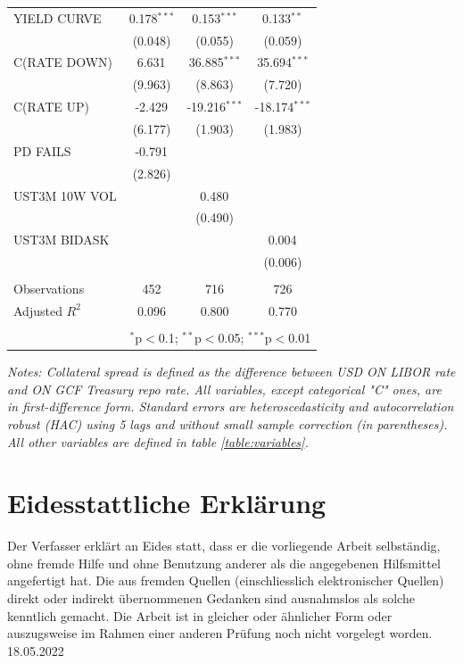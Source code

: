 \documentclass[11pt,a4paper,english,oneside]{article}
\begin{document}
\begin{appendices}
\begin{table}[!htbp]
\begin{tabular}{@{\extracolsep{5pt}}lccc}
 YIELD CURVE & 0.178$^{***}$ & 0.153$^{***}$ & 0.133$^{**}$ \\
  & (0.048) & (0.055) & (0.059) \\
 C(RATE DOWN) & 6.631$^{}$ & 36.885$^{***}$ & 35.694$^{***}$ \\
  & (9.963) & (8.863) & (7.720) \\
 C(RATE UP) & -2.429$^{}$ & -19.216$^{***}$ & -18.174$^{***}$ \\
  & (6.177) & (1.903) & (1.983) \\
 PD FAILS & -0.791$^{}$ & & \\
  & (2.826) & & \\
 UST3M 10W VOL & & 0.480$^{}$ & \\
  & & (0.490) & \\
 UST3M BIDASK & & & 0.004$^{}$ \\
  & & & (0.006) \\
\hline \\[-1.8ex]
 Observations & 452 & 716 & 726 \\
 Adjusted $R^2$ & 0.096 & 0.800 & 0.770 \\
\hline
\hline \\[-1.8ex]
 & \multicolumn{3}{r}{$^{*}$p$<$0.1; $^{**}$p$<$0.05; $^{***}$p$<$0.01} \\
\end{tabular}
\begin{flushleft}
\vspace{-5pt}
  \textit{Notes: Collateral spread is defined as the difference between USD ON LIBOR rate and ON GCF Treasury repo rate. All variables, except categorical "C" ones, are in first-difference form. Standard errors are heteroscedasticity and autocorrelation robust (HAC) using 5 lags and without small sample correction (in parentheses). All other variables are defined in table \ref{table:variables}.}
\end{flushleft}
\label{regression:3}
\end{table}

\end{appendices}

\newpage


\newpage
\thispagestyle{firststyle}
\section*{Eidesstattliche Erklärung}
Der Verfasser erklärt an Eides statt, dass er die vorliegende Arbeit selbständig, ohne fremde Hilfe und ohne Benutzung anderer als die angegebenen Hilfsmittel angefertigt hat. Die aus fremden Quellen (einschliesslich elektronischer Quellen) direkt oder indirekt übernommenen Gedanken sind ausnahmslos als solche kenntlich gemacht. Die Arbeit ist in gleicher oder ähnlicher Form oder auszugsweise im Rahmen einer anderen Prüfung noch nicht vorgelegt worden.\\[2cm]

\hspace{60pt} 18.05.2022

 \hfill {}
\end{document}
